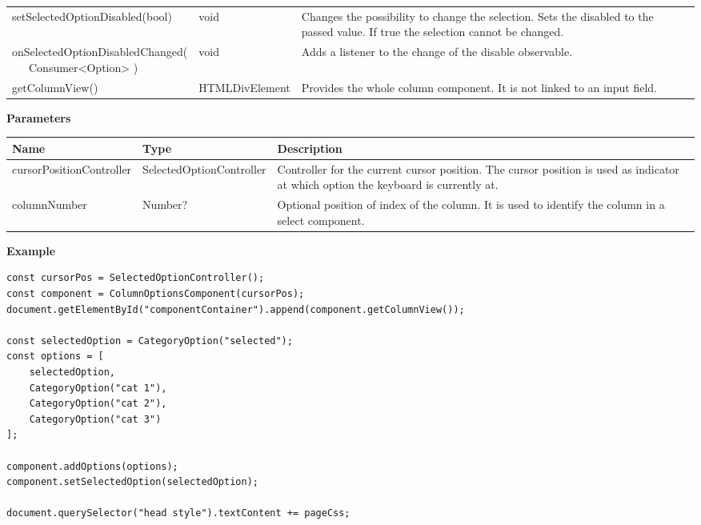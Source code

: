 \begin{table}[!htb]
\begin{tabular}{ p{5cm} p{3cm} p{5cm} }
        setSelectedOptionDisabled(bool)     & void           & Changes the possibility to change the selection. 
                                                               Sets the disabled to the passed value. 
                                                               If true the selection cannot be changed. \\
        \tbbr{
            onSelectedOptionDisabledChanged( \\
                \ \ \ Consumer<Option>
            )}                              & void           & Adds a listener to the change of the disable observable. \\
        getColumnView()                     & HTMLDivElement & Provides the whole column component. 
                                                               It is not linked to an input field. \\
        \bottomrule[1.2pt]
    \end{tabular}
\end{table}

\vspace*{6pt}
\noindent
\textbf{Parameters}

\begin{table}[!htb] 
    \label{api:columnOptionsComponentParameter}
    \footnotesize
    \setlength\extrarowheight{4pt}
    \begin{tabular}{ p{3.2cm} p{4.2cm} p{5.6cm} }
        \toprule[1.2pt]
        \textbf{Name}            & \textbf{Type}            & \textbf{Description} \\
        \midrule
        cursorPositionController & SelectedOptionController & Controller for the current cursor position. 
                                                              The cursor position is used as indicator at which option the keyboard is currently at. \\
        columnNumber             & Number?                  & Optional position of index of the column. 
                                                              It is used to identify the column in a select component. \\
        \bottomrule[1.2pt]
    \end{tabular}
\end{table}

\vspace*{6pt}
\noindent
\textbf{Example}

\begin{lstlisting}[style = htmlcssjs, label = api:columnOptionsComponentExample]
const cursorPos = SelectedOptionController();
const component = ColumnOptionsComponent(cursorPos);
document.getElementById("componentContainer").append(component.getColumnView());

const selectedOption = CategoryOption("selected");
const options = [ 
    selectedOption,
    CategoryOption("cat 1"),
    CategoryOption("cat 2"),
    CategoryOption("cat 3") 
];

component.addOptions(options);
component.setSelectedOption(selectedOption);

document.querySelector("head style").textContent += pageCss;
\end{lstlisting}

